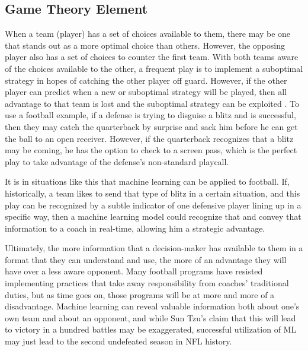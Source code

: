 \documentclass{article}
\begin{document}
\subsection{Game Theory Element}
When a team (player) has a set of choices available to them, there may be one that stands out as a more optimal choice than others. However, the opposing player also has a set of choices to counter the first team. With both teams aware of the choices available to the other, a frequent play is to implement a suboptimal strategy in hopes of catching the other player off guard. However, if the other player can predict when a new or suboptimal strategy will be played, then all advantage to that team is lost and the suboptimal strategy can be exploited \cite{AFA1}. To use a football example, if a defense is trying to disguise a blitz and is successful, then they may catch the quarterback by surprise and sack him before he can get the ball to an open receiver. However, if the quarterback recognizes that a blitz may be coming, he has the option to check to a screen pass, which is the perfect play to take advantage of the defense's non-standard playcall.

It is in situations like this that machine learning can be applied to football. If, historically, a team likes to send that type of blitz in a certain situation, and this play can be recognized by a subtle indicator of one defensive player lining up in a specific way, then a machine learning model could recognize that and convey that information to a coach in real-time, allowing him a strategic advantage. 

Ultimately, the more information that a decision-maker has available to them in a format that they can understand and use, the more of an advantage they will have over a less aware opponent. Many football programs have resisted implementing practices that take away responsibility from coaches' traditional duties, but as time goes on, those programs will be at more and more of a disadvantage. Machine learning can reveal valuable information both about one's own team and about an opponent, and while Sun Tzu's claim that this will lead to victory in a hundred battles may be exaggerated, successful utilization of ML may just lead to the second undefeated season in NFL history. 

\newpage
\end{document}

